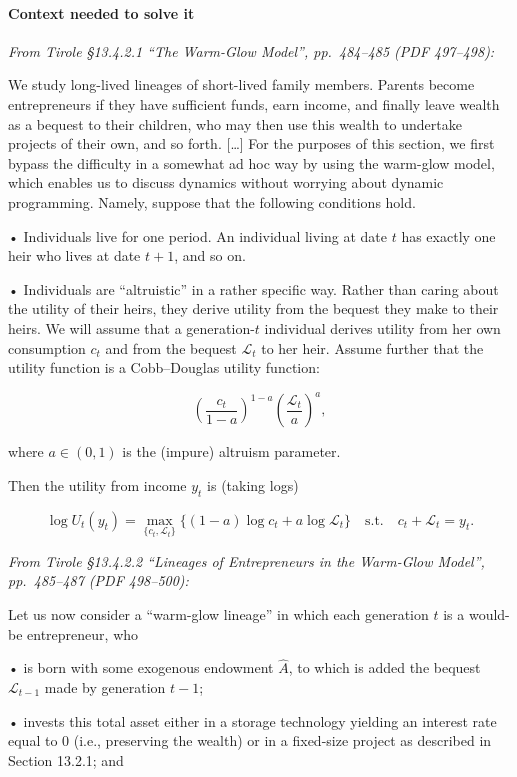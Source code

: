 \documentclass[11pt,a4paper]{article}
\begin{document}
\paragraph{Context needed to solve it}

\emph{From Tirole §13.4.2.1 ``The Warm-Glow Model'', pp.~484--485 (PDF 497--498):}

We study long-lived lineages of short-lived family members. Parents become entrepreneurs if they
have sufficient funds, earn income, and finally leave wealth as a bequest to their children, who may
then use this wealth to undertake projects of their own, and so forth. {[}\ldots{]} For the purposes
of this section, we first bypass the difficulty in a somewhat ad hoc way by using the warm-glow
model, which enables us to discuss dynamics without worrying about dynamic programming. Namely,
suppose that the following conditions hold.

• Individuals live for one period. An individual living at date \(t\) has exactly one heir who lives
at date \(t + 1\), and so on.

• Individuals are ``altruistic'' in a rather specific way. Rather than caring about the utility of
their heirs, they derive utility from the bequest they make to their heirs. We will assume that a
generation-\(t\) individual derives utility from her own consumption \(c_t\) and from the bequest
\(\mathcal{L}_t\) to her heir. Assume further that the utility function is a Cobb--Douglas utility
function:

\[\left(\frac{c_t}{1 - a}\right)^{1-a}\left(\frac{\mathcal{L}_t}{a}\right)^a,\]

where \(a \in (0, 1)\) is the (impure) altruism parameter.

Then the utility from income \(y_t\) is (taking logs)

\[\log U_t(y_t) = \max_{\{c_t, \mathcal{L}_t\}}\{(1 - a)\log c_t + a\log\mathcal{L}_t\} \quad\text{s.t.}\quad c_t + \mathcal{L}_t = y_t.\]

\emph{From Tirole §13.4.2.2 ``Lineages of Entrepreneurs in the Warm-Glow Model'', pp.~485--487 (PDF
498--500):}

Let us now consider a ``warm-glow lineage'' in which each generation \(t\) is a would-be
entrepreneur, who

• is born with some exogenous endowment \(\hat A\), to which is added the bequest
\(\mathcal{L}_{t-1}\) made by generation \(t - 1\);

• invests this total asset either in a storage technology yielding an interest rate equal to 0
(i.e., preserving the wealth) or in a fixed-size project as described in Section 13.2.1; and
\end{document}
